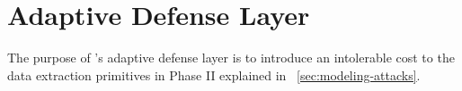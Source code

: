 %








\section{Adaptive Defense Layer}
The purpose of \thename's adaptive defense layer is to introduce an intolerable cost to the data extraction primitives in Phase II explained in ~\cref{sec:modeling-attacks}.

